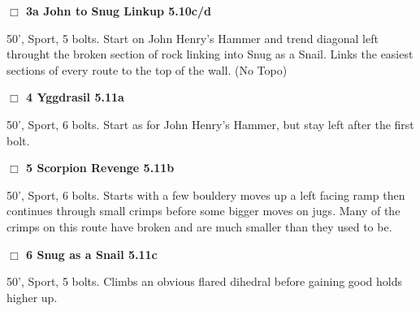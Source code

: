 \begin{multicols}{2}
\begin{adjustwidth}{0.5cm}{}
\needspace{2em}
\label{vr:John to Snug Linkup}
\colorbox{RoyalBlue!20}{
\parbox{0.95\linewidth}{
\hspace{-1ex}\textbf{$\Box$
3a John to Snug Linkup 5.10c/d  
}}}
\begin{adjustwidth}{1.3em}{}			

50', Sport, 5 bolts. Start on John Henry's Hammer and trend diagonal left throught the broken section of rock linking into Snug as a Snail. Links the easiest sections of every route to the top of the wall.
  (No Topo)
\end{adjustwidth}



\end{adjustwidth}


\needspace{2em}
\label{rt:Yggdrasil}
\colorbox{RoyalBlue!20}{
\parbox{0.95\linewidth}{
\hspace{-1ex}\textbf{$\Box$
4 Yggdrasil 5.11a  
}}}
\begin{adjustwidth}{1.3em}{}			

50', Sport, 6 bolts. Start as for John Henry's Hammer, but stay left after the first bolt.
\end{adjustwidth}




\needspace{2em}
\label{rt:Scorpion Revenge}
\colorbox{RoyalBlue!20}{
\parbox{0.95\linewidth}{
\hspace{-1ex}\textbf{$\Box$
5 Scorpion Revenge 5.11b  
}}}
\begin{adjustwidth}{1.3em}{}			

50', Sport, 6 bolts. Starts with a few bouldery moves up a left facing ramp then continues through small crimps before some bigger moves on jugs. Many of the crimps on this route have broken and are much smaller than they used to be.
\end{adjustwidth}




\needspace{2em}
\label{rt:Snug as a Snail}
\colorbox{RoyalBlue!20}{
\parbox{0.95\linewidth}{
\hspace{-1ex}\textbf{$\Box$
6 Snug as a Snail 5.11c  
}}}
\begin{adjustwidth}{1.3em}{}			

50', Sport, 5 bolts. Climbs an obvious flared dihedral before gaining good holds higher up.
\end{adjustwidth}





\end{multicols}
